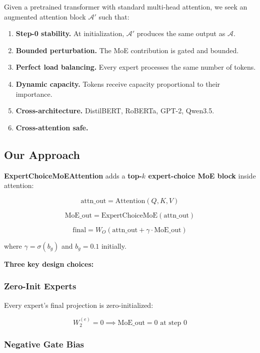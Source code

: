 Given a pretrained transformer with standard multi-head attention, we seek 
an augmented attention block $\mathcal{A}'$ such that:

\begin{enumerate}
\item \textbf{Step-0 stability.} At initialization, $\mathcal{A}'$ produces the
  same output as $\mathcal{A}$.
\item \textbf{Bounded perturbation.} The MoE contribution is gated and bounded.
\item \textbf{Perfect load balancing.} Every expert processes the same number of
  tokens.
\item \textbf{Dynamic capacity.} Tokens receive capacity proportional to their
  importance.
\item \textbf{Cross-architecture.} DistilBERT, RoBERTa, GPT-2, Qwen3.5.
\item \textbf{Cross-attention safe.}

\end{enumerate}
\subsection{Our Approach}

\textbf{ExpertChoiceMoEAttention} adds a \textbf{top-$k$ expert-choice MoE block} 
inside attention:

\[
\text{attn\_out} = \text{Attention}(Q, K, V)
\tag{1.1}
\]

\[
\text{MoE\_out} = \text{ExpertChoiceMoE}(\text{attn\_out})
\tag{1.2}
\]

\[
\text{final} = W_O \left( \text{attn\_out} + \gamma \cdot \text{MoE\_out} \right)
\tag{1.3}
\]

where $\gamma = \sigma(b_g)$ and $b_g = 0.1$ initially.

\textbf{Three key design choices:}

\subsubsection{Zero-Init Experts}

Every expert's final projection is zero-initialized:

\[
W_2^{(e)} = 0 \implies \text{MoE\_out} = 0 \text{ at step 0}
\tag{1.4}
\]

\subsubsection{Negative Gate Bias}

